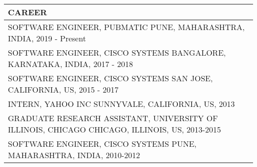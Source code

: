 \documentclass[a4paper,8pt]{extarticle}
\newcommand{\redfont}[1]{%
	{\color{textred}%
	\fontspec{Fjalla One}%
	\fontsize{14pt}{18pt}%
	\selectfont #1}}
\begin{document}
\bigskip
\begin{tabularx}{\linewidth}{X}
\large CAREER	\\\toprule
\redfont{SOFTWARE ENGINEER, PUBMATIC}\newline
PUNE, MAHARASHTRA, INDIA, 2019 - Present \\
\redfont{SOFTWARE ENGINEER, CISCO SYSTEMS}\newline
BANGALORE, KARNATAKA, INDIA, 2017 - 2018 \\
\redfont{SOFTWARE ENGINEER, CISCO SYSTEMS}\newline
SAN JOSE, CALIFORNIA, US, 2015 - 2017	\\
\redfont{INTERN, YAHOO INC}\newline
SUNNYVALE, CALIFORNIA, US, 2013 \\
\redfont{GRADUATE RESEARCH ASSISTANT, UNIVERSITY OF ILLINOIS, CHICAGO}\newline
CHICAGO, ILLINOIS, US, 2013-2015 \\
\redfont{SOFTWARE ENGINEER, CISCO SYSTEMS}\newline
PUNE, MAHARASHTRA, INDIA, 2010-2012	\\
\end{tabularx}
\end{document}
